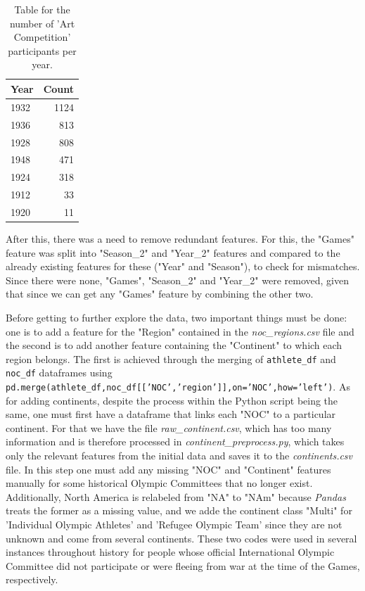 \documentclass[11pt]{article} %
\begin{document}
\begin{table}
\centering\begin{tabular}{lr}
\toprule
Year & Count  \\
\midrule
1932 &  1124 \\
1936 &   813 \\
1928 &   808 \\
1948 &   471 \\
1924 &   318 \\
1912 &    33 \\
1920 &    11 \\
\bottomrule
\end{tabular}
\caption{Table for the number of 'Art Competition' participants per year.}
\end{table}

After this, there was a need to remove redundant features. For this, the "Games" feature was split into "Season\_2" and "Year\_2" features and compared to the already existing features for these ("Year" and "Season"), to check for mismatches. Since there were none, "Games", "Season\_2" and "Year\_2" were removed, given that since we can get any "Games" feature by combining the other two.

Before getting to further explore the data, two important things must be done: one is to add a feature for the "Region" contained in the {\it noc\_regions.csv} file and the second is to add another feature containing the "Continent" to which each region belongs. The first is achieved through the merging of {\tt athlete\_df} and {\tt noc\_df} dataframes using {\tt pd.merge(athlete\_df,noc\_df[['NOC','region']],on='NOC',how='left')}. As for adding continents, despite the process within the Python script being the same, one must first have a dataframe that links each "NOC" to a particular continent. For that we have the file {\it raw\_continent.csv}, which has too many information and is therefore processed in {\it continent\_preprocess.py}, which takes only the relevant features from the initial data and saves it to the {\it continents.csv} file. In this step one must add any missing "NOC" and "Continent" features manually for some historical Olympic Committees that no longer exist. Additionally, North America is relabeled from "NA" to "NAm" because {\it Pandas} treats the former as a missing value, and we adde the continent class "Multi" for 'Individual Olympic Athletes' and 'Refugee Olympic Team' since they are not unknown and come from several continents. These two codes were used in several instances throughout history for people whose official International Olympic Committee did not participate or were fleeing from war at the time of the Games, respectively.
\end{document}
